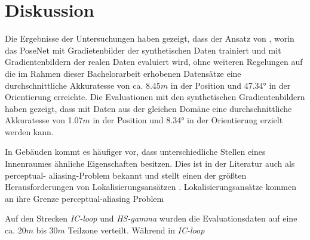 
\section{Diskussion}
\label{sec:kapitel_5}

Die Ergebnisse der Untersuchungen haben gezeigt, dass der Ansatz von \citet{acharyaBIMPoseNetIndoorCamera2019}, worin das PoseNet mit Gradietenbilder der synthetischen Daten trainiert und mit Gradientenbildern der realen Daten evaluiert wird, ohne weiteren Regelungen auf die im Rahmen dieser Bachelorarbeit erhobenen Datensätze eine durchschnittliche Akkuratesse von ca. 8.45$m$ in der Position und 47.34° in der Orientierung erreichte. Die Evaluationen mit den synthetischen Gradientenbildern haben gezeigt, dass mit Daten aus der gleichen Domäne eine durchschnittliche Akkuratesse von 1.07$m$ in der Position und 8.34° in der Orientierung erzielt werden kann. 


In Gebäuden kommt es häufiger vor, dass unterschiedliche Stellen eines Innenraumes ähnliche Eigenschaften besitzen. Dies ist in der Literatur auch als perceptual- aliasing-Problem bekannt und stellt einen der größten Herausforderungen von Lokalisierungsansätzen \cite{lowryVisualPlaceRecognition2016}.
Lokalisierungsansätze kommen an ihre Grenze 
perceptual-aliasing Problem

Auf den Strecken \textit{IC-loop} und \textit{HS-gamma} wurden die Evaluationsdaten auf eine ca. 20$m$ bis 30$m$ Teilzone verteilt. Während in \textit{IC-loop} 


%



% 




